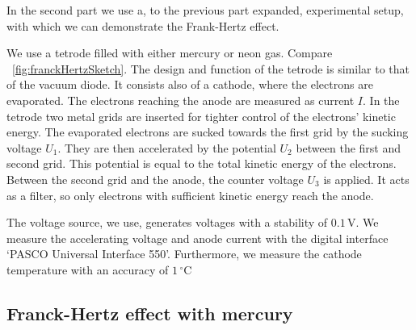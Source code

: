 \documentclass[a4paper,10pt,twocolumn]{article}
\newcommand{\volt}{\, \mathrm{V}}
\newcommand{\HgLevelA}{6^3\mathrm{P}_1}
\begin{document}
    In the second part we use a, to the previous part expanded, experimental setup,
    with which we can demonstrate the Frank-Hertz effect.
    
    We use a tetrode filled with either mercury or neon gas.
    Compare ~\autoref{fig:franckHertzSketch}.
    The design and function of the tetrode is similar to that of the vacuum diode.
    It consists also of a cathode, where the electrons are evaporated.
    The electrons reaching the anode are measured as current $I$.
    In the tetrode two metal grids are inserted for tighter control of the electrons' kinetic energy.
    The evaporated electrons are sucked towards the first grid by the sucking voltage $U_1$.
    They are then accelerated by the potential $U_2$ between the first and second grid.
    This potential is equal to the total kinetic energy of the electrons.
    Between the second grid and the anode, the counter voltage $U_3$ is applied.
    It acts as a filter, so only electrons with sufficient kinetic energy reach the anode.
    
    The voltage source, we use, generates voltages with a stability of $0.1\volt$.
    We measure the accelerating voltage and anode current with the digital interface `PASCO Universal Interface 550'.
    Furthermore, we measure the cathode temperature with an accuracy of $1 \, ^\circ \mathrm{C}$
    
    \subsection{Franck-Hertz effect with mercury}
    
\end{document}

